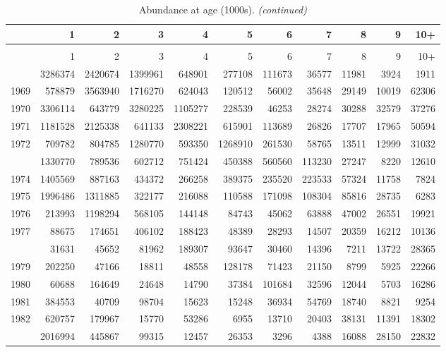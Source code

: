 \documentclass[
]{article}
\begin{document}
\begin{longtable}[t]{lrrrrrrrrrr}
\caption{\label{tab:NAA-table}Abundance at age (1000s).}\\
\toprule
  & 1 & 2 & 3 & 4 & 5 & 6 & 7 & 8 & 9 & 10+\\
\midrule
\endfirsthead
\caption[]{Abundance at age (1000s). \textit{(continued)}}\\
\toprule
  & 1 & 2 & 3 & 4 & 5 & 6 & 7 & 8 & 9 & 10+\\
\midrule
\endhead

\endfoot
\bottomrule
\endlastfoot
1968 & 3286374 & 2420674 & 1399961 & 648901 & 277108 & 111673 & 36577 & 11981 & 3924 & 1911\\
1969 & 578879 & 3563940 & 1716270 & 624043 & 120512 & 56002 & 35648 & 29149 & 10019 & 62306\\
1970 & 3306114 & 643779 & 3280225 & 1105277 & 228539 & 46253 & 28274 & 30288 & 32579 & 37276\\
1971 & 1181528 & 2125338 & 641133 & 2308221 & 615901 & 113689 & 26826 & 17707 & 17965 & 50594\\
1972 & 709782 & 804785 & 1280770 & 593350 & 1268910 & 261530 & 58765 & 13511 & 12999 & 31032\\
\addlinespace
1973 & 1330770 & 789536 & 602712 & 751424 & 450388 & 560560 & 113230 & 27247 & 8220 & 12610\\
1974 & 1405569 & 887163 & 434372 & 266258 & 389375 & 235520 & 223533 & 57324 & 11758 & 7824\\
1975 & 1996486 & 1311885 & 322177 & 216088 & 110588 & 171098 & 108304 & 85816 & 28735 & 6283\\
1976 & 213993 & 1198294 & 568105 & 144148 & 84743 & 45062 & 63888 & 47002 & 26551 & 19921\\
1977 & 88675 & 174651 & 406102 & 188423 & 48389 & 28293 & 14507 & 20359 & 16212 & 10136\\
\addlinespace
1978 & 31631 & 45652 & 81962 & 189307 & 93647 & 30460 & 14396 & 7211 & 13722 & 28365\\
1979 & 202250 & 47166 & 18811 & 48558 & 128178 & 71423 & 21150 & 8799 & 5925 & 22266\\
1980 & 60688 & 164649 & 24648 & 14790 & 37384 & 101684 & 32596 & 12044 & 5703 & 16286\\
1981 & 384553 & 40709 & 98704 & 15623 & 15248 & 36934 & 54769 & 18740 & 8821 & 9254\\
1982 & 620757 & 179967 & 15770 & 53286 & 6955 & 13710 & 20403 & 38131 & 11391 & 18302\\
\addlinespace
1983 & 2016994 & 445867 & 99315 & 12457 & 26353 & 3296 & 4388 & 16088 & 28150 & 22832\\

\end{longtable}
\end{document}
